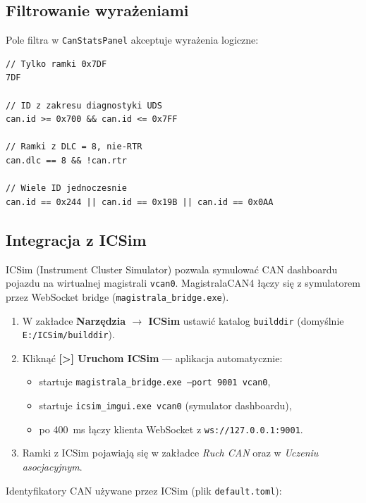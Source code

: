 \documentclass[12pt, a4paper]{article}
\begin{document}
\subsection{Filtrowanie wyrażeniami}

Pole filtra w \texttt{CanStatsPanel} akceptuje wyrażenia logiczne:

\begin{lstlisting}[style=cpp, caption={Przykłady filtrów wyrażeniowych}]
// Tylko ramki 0x7DF
7DF

// ID z zakresu diagnostyki UDS
can.id >= 0x700 && can.id <= 0x7FF

// Ramki z DLC = 8, nie-RTR
can.dlc == 8 && !can.rtr

// Wiele ID jednoczesnie
can.id == 0x244 || can.id == 0x19B || can.id == 0x0AA
\end{lstlisting}

\subsection{Integracja z ICSim}

ICSim (Instrument Cluster Simulator) pozwala symulować CAN dashboardu pojazdu
na wirtualnej magistrali \texttt{vcan0}. MagistralaCAN4 łączy się z symulatorem
przez WebSocket bridge (\texttt{magistrala\_bridge.exe}).

\begin{enumerate}
  \item W zakładce \textbf{Narzędzia $\to$ ICSim} ustawić katalog
        \texttt{builddir} (domyślnie \texttt{E:/ICSim/builddir}).
  \item Kliknąć \textbf{[>] Uruchom ICSim} --- aplikacja automatycznie:
    \begin{itemize}
      \item startuje \texttt{magistrala\_bridge.exe --port 9001 vcan0},
      \item startuje \texttt{icsim\_imgui.exe vcan0} (symulator dashboardu),
      \item po 400~ms łączy klienta WebSocket z \texttt{ws://127.0.0.1:9001}.
    \end{itemize}
  \item Ramki z ICSim pojawiają się w zakładce \emph{Ruch CAN}
        oraz w \emph{Uczeniu asocjacyjnym}.
\end{enumerate}

Identyfikatory CAN używane przez ICSim (plik \texttt{default.toml}):
\end{document}
